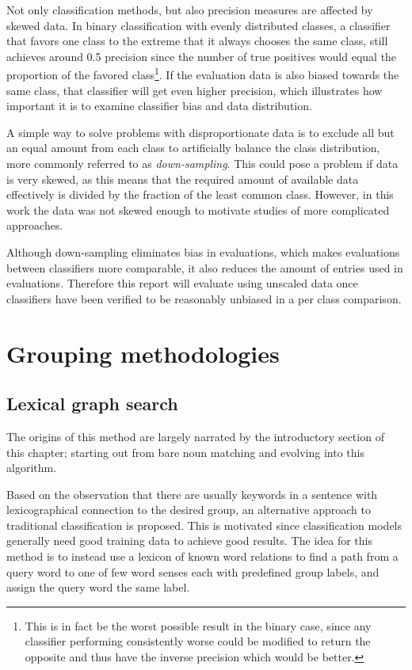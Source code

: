 \documentclass[a4paper,11pt]{kth-mag}
\begin{document}
Not only classification methods, but also precision measures are affected by skewed data. In binary
classification with evenly distributed classes, a classifier that favors one class to the extreme that it
always chooses the same class, still achieves around 0.5 precision since the number of true positives
would equal the proportion of the favored class\footnote{This is in fact be the worst possible result
in the binary case, since any classifier performing consistently worse could be modified to return the
opposite and thus have the inverse precision which would be better.}.
If the evaluation data is also biased towards the same class, that classifier will get even
higher precision, which illustrates how important it is to examine classifier
bias and data distribution.

A simple way to solve problems with disproportionate data is to exclude all but an equal amount
from each class to artificially balance the class distribution,
more commonly referred to as \emph{down-sampling}\cite{provost2000machine}.
This could pose a problem if data is very skewed, as this means that the required
amount of available data effectively is divided by the fraction of the least common class.
However, in this work the data was not skewed enough to motivate studies of more
complicated approaches.

Although down-sampling eliminates bias in evaluations, which makes evaluations between
classifiers more comparable, it also reduces the amount of entries used in evaluations.
Therefore this report will evaluate using unscaled data once classifiers have been
verified to be reasonably unbiased in a per class comparison.


\clearpage
\section{Grouping methodologies}
\subsection{Lexical graph search}
The origins of this method are largely narrated by the introductory section of this chapter;
starting out from bare noun matching and evolving into this algorithm.

Based on the observation that there are usually keywords in a sentence with lexicographical
connection to the desired group, an alternative approach to traditional classification is proposed.
This is motivated since classification models generally need good training data to achieve good results.
The idea for this method is to instead use a lexicon of known word relations to find a path from a query
word to one of few word senses each with predefined group labels, and assign the query word the same label.
\end{document}

